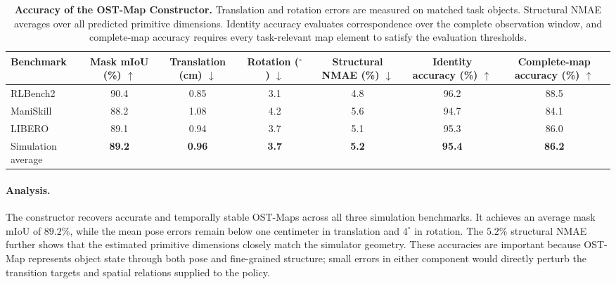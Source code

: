 \begin{table}[t]
    \centering
    \caption{\textbf{Accuracy of the OST-Map Constructor.}
    Translation and rotation errors are measured on matched task objects.
    Structural NMAE averages over all predicted primitive dimensions.
    Identity accuracy evaluates correspondence over the complete observation
    window, and complete-map accuracy requires every task-relevant map element
    to satisfy the evaluation thresholds.}
    \label{tab:ost_map_accuracy}
    \vspace{2pt}
    \small
    \setlength{\tabcolsep}{6pt}
    \begin{adjustbox}{max width=\textwidth}
    \begin{tabular}{lcccccc}
        \toprule
        Benchmark
        & Mask mIoU (\%) $\uparrow$
        & Translation (cm) $\downarrow$
        & Rotation ($^\circ$) $\downarrow$
        & Structural NMAE (\%) $\downarrow$
        & Identity accuracy (\%) $\uparrow$
        & Complete-map accuracy (\%) $\uparrow$ \\
        \midrule
        RLBench2
        & 90.4 & 0.85 & 3.1 & 4.8 & 96.2 & 88.5 \\
        ManiSkill
        & 88.2 & 1.08 & 4.2 & 5.6 & 94.7 & 84.1 \\
        LIBERO
        & 89.1 & 0.94 & 3.7 & 5.1 & 95.3 & 86.0 \\
        \midrule
        Simulation average
        & \textbf{89.2} & \textbf{0.96} & \textbf{3.7}
        & \textbf{5.2} & \textbf{95.4} & \textbf{86.2} \\
        \bottomrule
    \end{tabular}
    \end{adjustbox}
\end{table}

\paragraph{Analysis.}
The constructor recovers accurate and temporally stable OST-Maps across all
three simulation benchmarks. It achieves an average mask mIoU of $89.2\%$,
while the mean pose errors remain below one centimeter in translation and
$4^\circ$ in rotation. The $5.2\%$ structural NMAE further shows that the
estimated primitive dimensions closely match the simulator geometry. These
accuracies are important because OST-Map represents object state through both
pose and fine-grained structure; small errors in either component would
directly perturb the transition targets and spatial relations supplied to the
policy.

